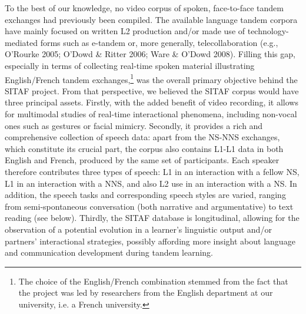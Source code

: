 \documentclass[12pt]{article}
\newenvironment{styleStandard}{\setlength\leftskip{0cm}\setlength\rightskip{0cm plus 1fil}\setlength\parindent{0cm}\setlength\parfillskip{0pt plus 1fil}\setlength\parskip{0cm plus 1pt}\writerlistparindent\writerlistleftskip\leavevmode\normalfont\normalsize\writerlistlabel\ignorespaces}{\unskip\vspace{0cm plus 1pt}\par}
\newcommand\writerlistleftskip{}
\newcommand\writerlistparindent{}
\newcommand\writerlistlabel{}
\begin{document}
\begin{styleStandard}
To the best of our knowledge, no video corpus of spoken, face-to-face tandem exchanges had previously been compiled. The available language tandem corpora have mainly focused on written L2 production and/or made use of technology-mediated forms such as e-tandem or, more generally, telecollaboration (e.g., O’Rourke 2005; O’Dowd \& Ritter 2006; Ware \& O’Dowd 2008). Filling this gap, especially in terms of collecting real-time spoken material illustrating English/French tandem exchanges,\footnote{\textrm{ The choice of the English/French combination stemmed from the fact that the project was led by researchers from the English department at our university, i.e. a French university.}} was the overall primary objective behind the SITAF project. From that perspective, we believed the SITAF corpus would have three principal assets. Firstly, with the added benefit of video recording, it allows for multimodal studies of real-time interactional phenomena, including non-vocal ones such as gestures or facial mimicry. Secondly, it provides a rich and comprehensive collection of speech data: apart from the NS-NNS exchanges, which constitute its crucial part, the corpus also contains L1-L1 data in both English and French, produced by the same set of participants. Each speaker therefore contributes three types of speech: L1 in an interaction with a fellow NS, L1 in an interaction with a NNS, and also L2 use in an interaction with a NS. In addition, the speech tasks and corresponding speech styles are varied, ranging from semi-spontaneous conversation (both narrative and argumentative) to text reading (see below). Thirdly, the SITAF database is longitudinal, allowing for the observation of a potential evolution in a learner’s linguistic output and/or partners’ interactional strategies, possibly affording more insight about language and communication development during tandem learning.
\end{styleStandard}
\end{document}
